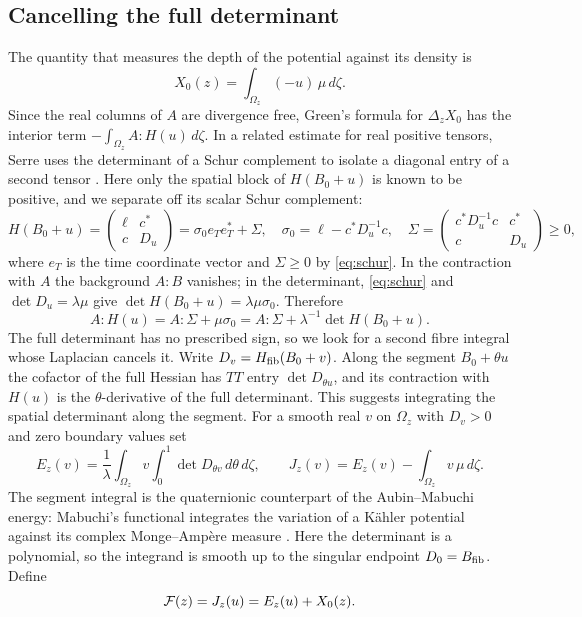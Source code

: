 \subsection{Cancelling the full determinant}\label{ssec:cancel}
The quantity that measures the depth of the potential against its density is
\[
X_0(z)=\int_{\Omega_z}(-u)\,\mu\,d\zeta .
\]
Since the real columns of $A$ are divergence free, Green's formula for $\Delta_zX_0$ has the
interior term $-\int_{\Omega_z}A:H(u)\,d\zeta$. In a related estimate for real positive tensors,
Serre uses the determinant of a Schur complement to isolate a diagonal entry of a second tensor
\cite[Proposition 2.2]{Ser23}. Here only the spatial block of $H(B_0+u)$ is known to be
positive, and we separate off its scalar Schur complement:
\begin{equation}\label{eq:sigma0}
H(B_0+u)=\begin{pmatrix}\ell&c^*\\c&D_u\end{pmatrix}=\sigma_0e_Te_T^*+\Sigma,\quad
\sigma_0=\ell-c^*D_u^{-1}c,\quad
\Sigma=\begin{pmatrix}c^*D_u^{-1}c&c^*\\c&D_u\end{pmatrix}\ge0 ,
\end{equation}
where $e_T$ is the time coordinate vector and $\Sigma\ge0$ by \eqref{eq:schur}. In the
contraction with $A$ the background $A:B$ vanishes; in the determinant, \eqref{eq:schur} and
$\det D_u=\lambda\mu$ give $\det H(B_0+u)=\lambda\mu\sigma_0$. Therefore
\begin{equation}\label{eq:AHu}
A:H(u)=A:\Sigma+\mu\sigma_0=A:\Sigma+\lambda^{-1}\det H(B_0+u).
\end{equation}
The full determinant has no prescribed sign, so we look for a second fibre integral whose
Laplacian cancels it. Write $D_v=H_{\mathrm{fib}}(B_0+v)$. Along the segment $B_0+\theta u$ the cofactor of
the full Hessian has $TT$ entry $\det D_{\theta u}$, and its contraction with $H(u)$ is the
$\theta$-derivative of the full determinant. This suggests integrating the spatial determinant
along the segment. For a smooth real $v$ on $\Omega_z$ with $D_v>0$ and zero boundary values set
\begin{equation}\label{eq:energy}
E_z(v)=\frac1\lambda\int_{\Omega_z}v\int_0^1\det D_{\theta v}\,d\theta\,d\zeta,\qquad
J_z(v)=E_z(v)-\int_{\Omega_z}v\,\mu\,d\zeta .
\end{equation}
The segment integral is the quaternionic counterpart of the Aubin--Mabuchi energy: Mabuchi's
functional integrates the variation of a K\"ahler potential against its complex Monge--Amp\`ere
measure \cite[(2.2.1)]{Mab86}. Here the determinant is a polynomial, so the integrand is smooth
up to the singular endpoint $D_0=B_{\rm fib}$. Define
\[
\mathcal F(z)=J_z(u)=E_z(u)+X_0(z).
\]

